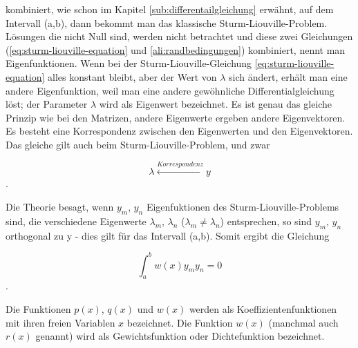 kombiniert, wie schon im Kapitel \ref{sub:differentailgleichung} erwähnt, auf dem Intervall (a,b), dann bekommt man das klassische Sturm-Liouville-Problem.
Lösungen die nicht Null sind, werden nicht betrachtet und diese zwei Gleichungen (\ref{eq:sturm-liouville-equation} und \ref{ali:randbedingungen}) kombiniert, nennt man Eigenfunktionen.
Wenn bei der Sturm-Liouville-Gleichung \ref{eq:sturm-liouville-equation} alles  konstant bleibt, aber der Wert von $\lambda$ sich ändert, erhält man eine andere Eigenfunktion, weil man eine andere gewöhnliche Differentialgleichung löst;
der Parameter $\lambda$ wird als Eigenwert bezeichnet.
Es ist genau das gleiche Prinzip wie bei den Matrizen, andere Eigenwerte ergeben andere Eigenvektoren.
Es besteht eine Korrespondenz zwischen den Eigenwerten und den Eigenvektoren.
Das gleiche gilt auch beim Sturm-Liouville-Problem, und zwar

\begin{equation}
	\lambda \overset{Korrespondenz}\leftrightarrow y
\end{equation}.

Die Theorie besagt, wenn $y_m$, $y_n$ Eigenfuktionen des Sturm-Liouville-Problems sind, die verschiedene Eigenwerte $\lambda_m$, $\lambda_n$ ($\lambda_m \neq \lambda_n$) entsprechen, so sind $y_m$, $y_n$ orthogonal zu y -
dies gilt für das Intervall (a,b).
Somit ergibt die Gleichung

\begin{equation}
	\int_{a}^{b} w(x)y_m y_n = 0
\end{equation}.

Die Funktionen $p(x)$, $q(x)$ und $w(x)$ werden als Koeffizientenfunktionen mit ihren freien Variablen $x$ bezeichnet. Die Funktion $w(x)$ (manchmal auch $r(x)$ genannt) wird als Gewichtsfunktion oder Dichtefunktion bezeichnet.




 




